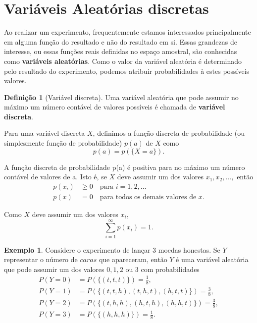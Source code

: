 \documentclass[]{book}
\theoremstyle{definition}
\newtheorem{definition}{Definição}[chapter]
\theoremstyle{definition}
\newtheorem{example}{Exemplo}[chapter]
\theoremstyle{definition}
\theoremstyle{remark}
\begin{document}
\hypertarget{variuxe1veis-aleatuxf3rias-discretas}{%
\section{Variáveis Aleatórias discretas}\label{variuxe1veis-aleatuxf3rias-discretas}}

Ao realizar um experimento, frequentemente estamos interessados principalmente em alguma função do resultado e não do resultado em si.
Essas grandezas de interesse, ou essas funções reais definidas no espaço amostral, são conhecidas como \textbf{variáveis aleatórias}.
Como o valor da variável aleatória é determinado pelo resultado do experimento, podemos atribuir probabilidades à estes possíveis valores.

\begin{definition}[Variável discreta]
\protect\hypertarget{def:defVAdiscreta}{}{\label{def:defVAdiscreta} \iffalse (Variável discreta) \fi{} }Uma variável aleatória que pode assumir no máximo um número contável de valores possíveis é chamada de \textbf{variável discreta}.
\end{definition}

Para uma variável discreta \(X\), definimos a função discreta de probabilidade (ou simplesmente função de probabilidade) \(p(a)\) de \(X\) como
\[p(a) = p(\{X=a\}).\]

A função discreta de probabilidade p(a) é positiva para no máximo um número contável de valores de a.
Isto é, se \(X\) deve assumir um dos valores \(x_1, x_2, \ldots,\) então
\begin{align}
  p(x_i) &\geq 0 \quad \text{para } i=1,2,\ldots\\
  p(x) &= 0 \quad \text{para todos os demais valores de } x.
\end{align}

Como \(X\) deve assumir um dos valores \(x_i\),
\[\sum_{i=1}^{\infty}p(x_i)=1.\]

\begin{example}
\protect\hypertarget{exm:unnamed-chunk-165}{}{\label{exm:unnamed-chunk-165} }Considere o experimento de lançar 3 moedas honestas.
Se \(Y\) representar o número de \(caras\) que apareceram, então \(Y\) é uma variável aleatória que pode assumir um dos valores \(0,1,2\) ou \(3\) com probabilidades
\begin{align}
P(Y=0) &= P(\{(t,t,t)\}) = \frac{1}{8}, \\
P(Y=1) &= P(\{(t,t,h),(t,h,t),(h,t,t)\}) = \frac{3}{8}, \\
P(Y=2) &= P(\{(t,h,h),(h,t,h),(h,h,t)\}) = \frac{3}{8}, \\
P(Y=3) &= P(\{(h,h,h)\}) = \frac{1}{8}.
\end{align}
\end{example}
\end{document}
